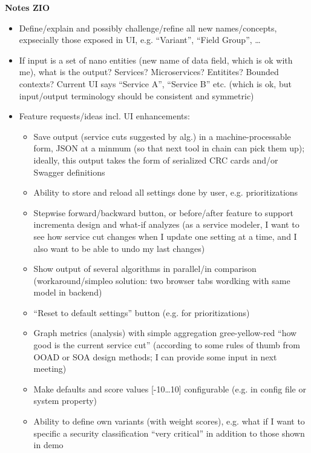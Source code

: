 \textbf{Notes ZIO}
\begin{itemize}
\item Define/explain and possibly challenge/refine all new names/concepts, expsecially those exposed in UI, e.g. \enquote{Variant}, \enquote{Field Group}, \dots
\item If input is a set of nano entities (new name of data field, which is ok with me), what is the output? Services? Microservices? Entitites? Bounded contexts? Current UI says \enquote{Service A}, \enquote{Service B} etc. (which is ok, but input/output terminology should be consistent and symmetric) 
\item Feature requests/ideas incl. UI enhancements:

	\begin{itemize}
	\item Save output (service cuts suggested by alg.) in a machine-processable form, JSON at a minmum (so that next tool in chain can pick them up); ideally, this output takes the form of serialized CRC cards and/or Swagger definitions 
	\item Ability to store and reload all settings done by user, e.g. prioritizations
	\item Stepwise forward/backward button, or before/after feature to support incrementa design and what-if analyzes (as a service modeler, I want to see how service cut changes when I update one setting at a time, and I also want to be able to undo my last changes)
	\item Show output of several algorithms in parallel/in comparison (workaround/simpleo solution: two browser tabs wordking with same model in backend)
	\item \enquote{Reset to default settings} button (e.g. for prioritizations)
	\item Graph metrics (analysis) with simple aggregation gree-yellow-red \enquote{how good is the current service cut} (according to some rules of thumb from OOAD or SOA design methods; I  can provide some input in next meeting)
	\item Make defaults and score values [-10…10] configurable (e.g. in config file or system property)
	\item Ability to define own variants (with weight scores), e.g. what if I want to specific a security classification \enquote{very critical} in addition to those shown in demo
	\end{itemize}

\end{itemize}

